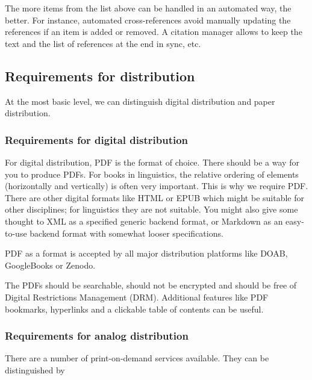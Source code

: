 \documentclass[nonflat,modfonts,output=book] {langsci/langscibook}
\begin{document}
The more items from the list above can be handled in an automated way, the better. For instance, automated cross-references avoid manually updating the references if an item is added or removed. A citation manager allows to keep the text and the list of references at the end in sync, etc. 
                        
                        
                        
\subsection{Requirements for distribution}
At the most basic level, we can distinguish digital distribution and paper distribution. 

\subsubsection{Requirements for digital distribution}
For digital distribution, PDF is the format of choice. There should be a way for you to produce PDFs.  For books in linguistics, the relative ordering of elements (horizontally and vertically) is often very important. This is why we require PDF. There are other digital formats like HTML or EPUB which might be suitable for other disciplines; for linguistics they are not suitable. You might also give some thought to XML as a specified generic backend format, or Markdown as an easy-to-use backend format with somewhat looser specifications. 

PDF as a format is accepted by all major distribution platforms like DOAB, GoogleBooks or Zenodo. 
 

The PDFs should be searchable, should not be encrypted and should be free of Digital Restrictions Management (DRM). Additional features like PDF bookmarks, hyperlinks and a clickable table of contents can be useful. 

\subsubsection{Requirements for analog distribution}
There are a number of print-on-demand services available. They can be distinguished by 
\end{document}
